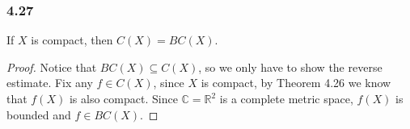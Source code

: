 \documentclass[../../main.tex]{subfiles}
\begin{document}
\subsubsection*{4.27}
\begin{wts}
If $X$ is compact, then $C(X)=BC(X)$.
\end{wts}
\begin{proof}
Notice that $BC(X)\subseteq C(X)$, so we only have to show the reverse estimate. Fix any $f\in C(X)$, since $X$ is compact, by Theorem 4.26 we know that $f(X)$ is also compact. Since $\mathbb{C}=\mathbb{R}^2$ is a complete metric space, $f(X)$ is bounded and $f\in BC(X)$.
\end{proof}
\end{document}
